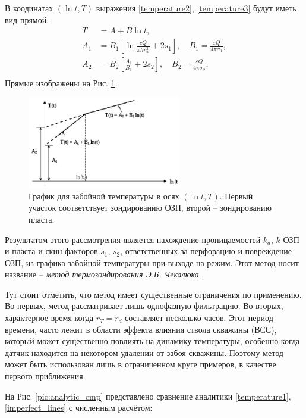 	В коодинатах $(\ln{t}, T)$ выражения \eqref{temperature2}, \eqref{temperature3} будут иметь вид прямой:
\begin{align}	
	\label{imperfect_lines}
	T &= A + B\ln t,\\
	A_1 &= B_1\left[\ln\frac{cQ}{\pi h r_w^2} + 2s_1\right], \quad B_1 = \frac{\varepsilon Q}{4\pi\sigma_1},\\
	A_2 &= B_2\left[\frac{A_1}{B_1} + 2s_2\right], \quad B_2 = \frac{\varepsilon Q}{4\pi\sigma_2},\\
\end{align}
	Прямые изображены на Рис. \ref{pic:imperfect_lines}:
\begin{figure}[H]
	\centerline{\includegraphics[width=0.6\textwidth]{pic/imperfect_lines.png}}
	\caption{График для забойной температуры в осях $(\ln t, T)$. Первый участок соответствует зондированию ОЗП, второй -- зондированию пласта.}
	\label{pic:imperfect_lines}
\end{figure}

	Результатом этого рассмотрения является нахождение проницаемостей $k_d$, $k$ ОЗП и пласта и скин-факторов $s_1$, $s_2$, ответственных за перфорацию и повреждение ОЗП, из графика забойной температуры при выходе на режим. Этот метод носит название -- \textit{метод термозондирования Э.Б. Чекалюка} \cite{checkalyuk}.

	Тут стоит отметить, что метод имеет существенные ограничения по применению. Во-первых, метод рассматривает лишь однофазную фильтрацию. Во-вторых, характерное время когда $r_T = r_d$ составляет несколько часов. Этот период времени, часто лежит в области эффекта влияния ствола скважины (ВСС), который может существенно повлиять на динамику температуры, особенно когда датчик находится на некотором удалении от забоя скважины. Поэтому метод может быть использован лишь в ограниченном круге примеров, в качестве первого приближения.
	
	На Рис. \ref{pic:analytic_cmp} представлено сравнение аналитики \eqref{temperature1}, \eqref{imperfect_lines} с численным расчётом:
	
